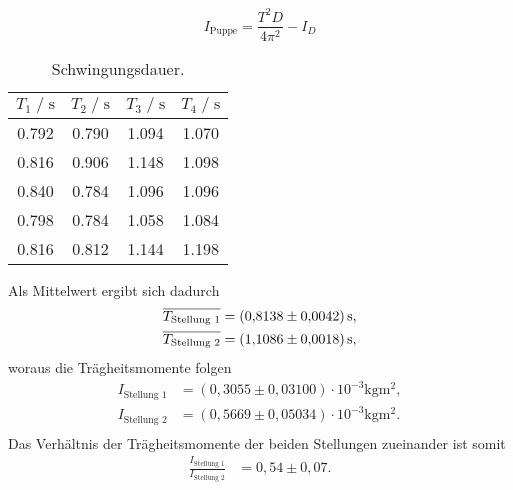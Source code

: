 
\begin{equation*}
  I_{\text{Puppe}} = \frac{T^2D}{4\pi^2} - I_D
\end{equation*}

\begin{table}[H]
    \centering
        \caption{Schwingungsdauer.}
        \label{tab:schwingdauer}
        \begin{tabular}{c c c c}
        \toprule
        $T_1 \;/\; \si{\second}$ & $T_2 \;/\; \si{\second}$ & $T_3 \;/\; \si{\second}$ & $T_4 \;/\; \si{\second}$ \\
        \midrule
        0.792 & 0.790 & 1.094 & 1.070 \\
        0.816 & 0.906 & 1.148 & 1.098 \\
        0.840 & 0.784 & 1.096 & 1.096 \\
        0.798 & 0.784 & 1.058 & 1.084 \\
        0.816 & 0.812 & 1.144 & 1.198 \\
        \bottomrule
    \end{tabular}
\end{table}


Als Mittelwert ergibt sich dadurch
\begin{align*}
  \overline{T_{\text{Stellung 1}}} &=  \SI{0.8138 (0.0042)}{\second}, \\
  \overline{T_{\text{Stellung 2}}} &=  \SI{1.1086 (0.0018)}{\second}, \\
\end{align*}
woraus die Trägheitsmomente folgen %
\begin{align*}
  I_{\text{Stellung 1}} &= (0,3055\pm 0,03100) \cdot 10^{-3} \si{\kilogram\meter^2}, \\
  I_{\text{Stellung 2}} &= (0,5669\pm 0,05034) \cdot 10^{-3} \si{\kilogram\meter^2}. \\
\end{align*}
Das Verhältnis der Trägheitsmomente der beiden Stellungen zueinander ist somit
\begin{align*}
  \frac{I_{\text{Stellung 1}}}{I_{\text{Stellung 2}}} &= 0,54\pm 0,07.  \\
\end{align*}


